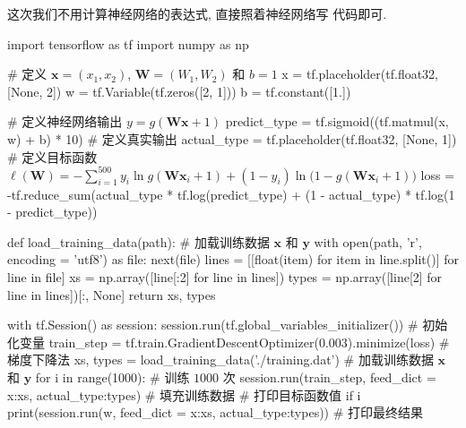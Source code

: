 \begin{frame}[fragile]{\insertsection}{\insertsubsection}
这次我们不用计算神经网络的表达式, 直接照着神经网络写 \tensorflow{} 代码即可.

\begin{pythoncode}[fontsize = \fontsize{8}{8}\selectfont]
import tensorflow as tf
import numpy as np

# 定义 $\bm{x} = (x_1, x_2)$, $\bm{W} = (W_1, W_2)$ 和 $b = 1$
x = tf.placeholder(tf.float32, [None, 2])
w = tf.Variable(tf.zeros([2, 1]))
b = tf.constant([1.])

# 定义神经网络输出 $y = g(\bm{W}\bm{x} + 1)$
predict_type = tf.sigmoid((tf.matmul(x, w) + b) * 10)
# 定义真实输出
actual_type = tf.placeholder(tf.float32, [None, 1])
# 定义目标函数 $\ell(\bm{W}) =  -\sum_{i = 1}^{500} y_i\ln g(\bm{W}\bm{x}_i + 1) + (1 - y_i)\ln\big(1 - g(\bm{W}\bm{x}_i + 1)\big)$
loss = -tf.reduce_sum(actual_type * tf.log(predict_type) + (1 - actual_type) * tf.log(1 - predict_type))
\end{pythoncode}

\vspace{-6.3cm}\hfill%
\end{frame}

\begin{frame}[fragile]{\insertsection}{\insertsubsection}
\begin{pythoncode}[fontsize = \fontsize{8}{8}\selectfont]
def load_training_data(path): # 加载训练数据 $\bm{x}$ 和 $\bm{y}$
  with open(path, 'r', encoding = 'utf8') as file:
    next(file)
    lines = [[float(item) for item in line.split()] for line in file]
    xs = np.array([line[:2] for line in lines])
    types = np.array([line[2] for line in lines])[:, None]
  return xs, types

with tf.Session() as session:
  session.run(tf.global_variables_initializer()) # 初始化变量
  train_step = tf.train.GradientDescentOptimizer(0.003).minimize(loss) # 梯度下降法
  xs, types = load_training_data('./training.dat') # 加载训练数据 $\bm{x}$ 和 $\bm{y}$
  for i in range(1000): # 训练 $1000$ 次
    session.run(train_step, feed_dict = {x:xs, actual_type:types}) # 填充训练数据
    # 打印目标函数值
    if i %
  print(session.run(w, feed_dict = {x:xs, actual_type:types})) # 打印最终结果
\end{pythoncode}
\end{frame}


